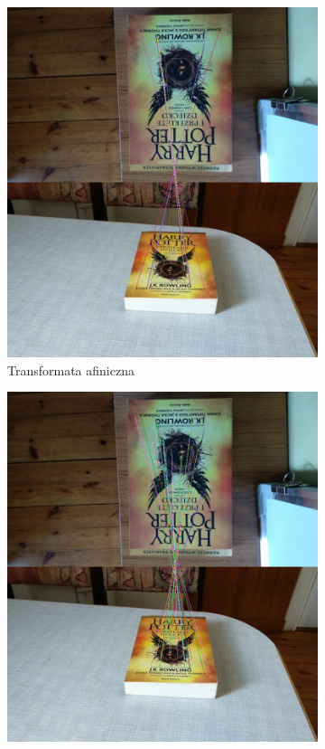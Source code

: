 \documentclass{article}
\begin{document}
	\begin{figure}[H]
		\centering
		\begin{subfigure}[b]{0.4\linewidth}
			\includegraphics[width=\linewidth]{a2-match.png}
			\caption{Transformata afiniczna}
		\end{subfigure}
		\begin{subfigure}[b]{0.4\linewidth}
			\includegraphics[width=\linewidth]{p2-match.png}

\end{subfigure}
\end{figure}
\end{document}
